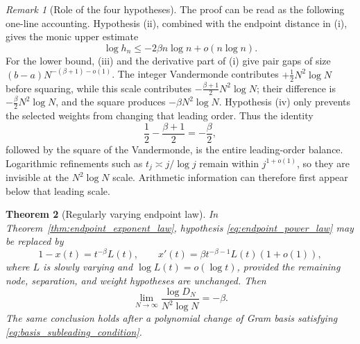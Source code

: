 \documentclass[preprint,12pt]{elsarticle}
\numberwithin{equation}{section}
\theoremstyle{plain}
\newtheorem{theorem}{Theorem}[section]
\theoremstyle{definition}
\theoremstyle{remark}
\newtheorem{remark}[theorem]{Remark}
\begin{document}
\begin{remark}[Role of the four hypotheses]
\label{rem:endpoint_hypothesis_roles}
The proof can be read as the following one-line accounting.  Hypothesis (ii), combined with the
endpoint distance in (i), gives the monic upper estimate
\[
\log h_n\le-2\beta n\log n+o(n\log n).
\]
For the lower bound, (iii) and the derivative part of (i) give pair gaps of size
\((b-a)N^{-(\beta+1)-o(1)}\).  The integer Vandermonde contributes
\(+\tfrac12N^2\log N\) before squaring, while this scale contributes
\(-\tfrac{\beta+1}{2}N^2\log N\); their difference is
\(-\tfrac\beta2N^2\log N\), and the square produces \(-\beta N^2\log N\).
Hypothesis (iv) only prevents the selected weights from changing that leading order.
Thus the identity
\[
\frac12-\frac{\beta+1}{2}=-\frac{\beta}{2},
\]
followed by the square of the Vandermonde, is the entire leading-order balance.
Logarithmic refinements such as \(t_j\asymp j/\log j\) remain within
\(j^{1+o(1)}\), so they are invisible at the \(N^2\log N\) scale.  Arithmetic information
can therefore first appear below that leading scale.
\end{remark}

\begin{theorem}[Regularly varying endpoint law]
\label{thm:endpoint_regular_variation}
In Theorem~\ref{thm:endpoint_exponent_law}, hypothesis
\eqref{eq:endpoint_power_law} may be replaced by
\begin{equation}
1-x(t)=t^{-\beta}L(t),
\qquad
x'(t)=\beta t^{-\beta-1}L(t)(1+o(1)),
\label{eq:endpoint_regular_variation}
\end{equation}
where \(L\) is slowly varying and \(\log L(t)=o(\log t)\), provided the remaining node,
separation, and weight hypotheses are unchanged.  Then
\begin{equation}
\lim_{N\to\infty}\frac{\log D_N}{N^2\log N}=-\beta.
\label{eq:endpoint_regular_variation_limit}
\end{equation}
The same conclusion holds after a polynomial change of Gram basis satisfying
\eqref{eq:basis_subleading_condition}.
\end{theorem}
\end{document}
